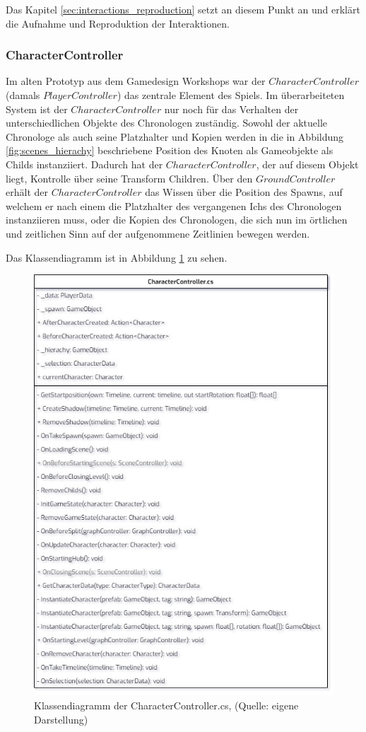 Das Kapitel \ref{sec:interactions_reproduction} setzt an diesem Punkt an und erklärt die Aufnahme und Reproduktion der Interaktionen.

\subsubsection{CharacterController}
Im alten Prototyp aus dem Gamedesign Workshops war der $CharacterController$ (damals $PlayerController$) das zentrale Element des Spiels. Im überarbeiteten System ist der $CharacterController$ nur noch für das Verhalten der unterschiedlichen Objekte des Chronologen zuständig. Sowohl der aktuelle Chronologe als auch seine Platzhalter und Kopien werden in die in Abbildung \ref{fig:scenes_hierachy} beschriebene Position des  Knoten als Gameobjekte als Childs instanziiert. Dadurch hat der $CharacterController$, der auf diesem  Objekt liegt, Kontrolle über seine Transform Children. Über den $GroundController$ erhält der $CharacterController$ das Wissen über die Position des Spawns, auf welchem er nach einem  die Platzhalter des vergangenen Ichs des Chronologen instanziieren muss, oder die Kopien des Chronologen, die sich nun im örtlichen und zeitlichen Sinn auf der aufgenommene Zeitlinien bewegen werden. 

Das Klassendiagramm ist in Abbildung \ref{fig:characterController-cs} zu sehen.

\begin{figure}[ht]
\centering
\includegraphics[width=0.6\linewidth]{content/pictures/CharacterController.jpg}
\caption{Klassendiagramm der CharacterController.cs, (Quelle: eigene Darstellung)}
\label{fig:characterController-cs}
\end{figure}

